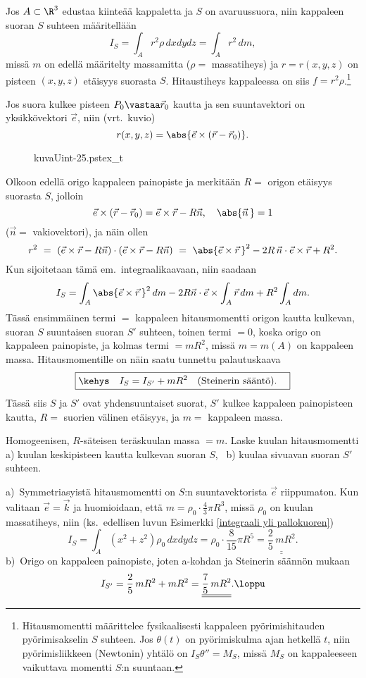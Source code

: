 Jos $A\subset\R^3$ edustaa kiinteää kappaletta ja $S$ on avaruussuora, niin kappaleen
 suoran $S$ suhteen määritellään
\[
I_S=\int_A r^2\rho\,dxdydz = \int_A r^2\,dm,
\]
missä $m$ on edellä määritelty massamitta ($\rho=$ massatiheys) ja $r=r(x,y,z)$ on pisteen 
$(x,y,z)$ etäisyys suorasta $S$. Hitaustiheys kappaleessa on siis
$f=r^2\rho$.\footnote[2]{Hitausmomentti määrittelee fysikaalisesti kappaleen pyörimishitauden
pyörimisakselin $S$ suhteen. Jos $\theta(t)$ on pyörimiskulma ajan hetkellä $t$, niin
pyörimisliikkeen (Newtonin) yhtälö on $I_S\theta''=M_S$, missä $M_S$ on kappaleeseen vaikuttava
momentti $S$:n suuntaan.} 
\begin{multicols}{2} \raggedcolumns
Jos suora kulkee pisteen $P_0\vastaa\vec r_0$ kautta ja sen suuntavektori on yksikkövektori 
$\vec e$, niin (vrt.\ kuvio)
\[
r(x,y,z)=\abs{\vec e\times(\vec r-\vec r_0)}.
\]
\begin{figure}[H]
\begin{center}
{kuvaUint-25.pstex_t}
\end{center}
\end{figure}
\end{multicols}
Olkoon edellä origo kappaleen painopiste ja merkitään $R=$ origon etäisyys suorasta $S$, jolloin
\[ 
\vec e\times(\vec r - \vec r_0) = \vec e\times\vec r - R\vec n, \quad \abs{\vec n\,}=1 
\]
($\vec n=$ vakiovektori), ja näin ollen
\[
r^2\ =\ (\vec e\times\vec r - R\vec n)\cdot(\vec e\times\vec r - R\vec n)\
     =\ \abs{\vec e\times\vec r\,}^2 - 2R\,\vec n\cdot\vec e\times\vec r + R^2.
\]
Kun sijoitetaan tämä em.\ integraalikaavaan, niin saadaan
\[ 
I_S = \int_A \abs{\vec e\times\vec r\,}^2\,dm - 2R\vec n\cdot\vec e\times\int_A \vec r\,dm 
                                              + R^2\int_A dm. 
\]
Tässä ensimmäinen termi $=$ kappaleen hitausmomentti origon kautta kulkevan, suoran $S$ 
suuntaisen suoran $S'$ suhteen, toinen termi $=0$, koska origo on kappaleen painopiste, ja 
kolmas termi $=mR^2$, missä $m=m(A)$ on kappaleen massa. Hitausmomentille on näin saatu 
\kor{Steinerin sääntönä} tunnettu palautuskaava
%
\[
\boxed{\kehys\quad I_S = I_{S'} + mR^2 \quad \text{(Steinerin sääntö).} \quad } 
\]
Tässä siis $S$ ja $S'$ ovat yhdensuuntaiset suorat, $S'$ kulkee kappaleen painopisteen kautta,
$R=$ suorien välinen etäisyys, ja $m=$ kappaleen massa.
\begin{Exa} Homogeenisen, $R$-säteisen teräskuulan massa $=m$. Laske kuulan hitausmomentti 
a) kuulan keskipisteen kautta kulkevan suoran $S$, \ b) kuulaa sivuavan suoran $S'$ suhteen.
\end{Exa}
\ratk a)\ Symmetriasyistä hitausmomentti on $S$:n suuntavektorista $\vec e$ riippumaton. Kun
valitaan $\vec e=\vec k$ ja huomioidaan, että $m=\rho_0\cdot\frac{4}{3}\pi R^3$, missä $\rho_0$
on kuulan massatiheys, niin (ks.\ edellisen luvun Esimerkki \ref{integraali yli pallokuoren})
\[
I_S = \int_A (x^2+z^2)\rho_0\,dxdydz = \rho_0\cdot\frac{8}{15}\pi R^5
                                     =\underline{\underline{\frac{2}{5}\,mR^2}}.
\]
b)\ Origo on kappaleen painopiste, joten a-kohdan ja Steinerin säännön mukaan
\[ 
I_{S'} = \frac{2}{5}\,mR^2 + mR^2 = \underline{\underline{\frac{7}{5}\,mR^2}}. \loppu 
\]


